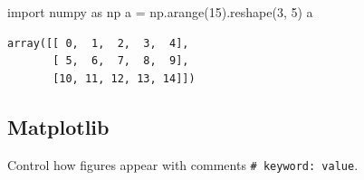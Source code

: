 \documentclass[
  letterpaper,
  DIV=11,
  numbers=noendperiod,
  oneside]{scrartcl}
\newenvironment{Shaded}{\begin{snugshade}}{\end{snugshade}}
\newcommand{\DecValTok}[1]{\textcolor[rgb]{0.68,0.00,0.00}{#1}}
\newcommand{\ImportTok}[1]{\textcolor[rgb]{0.00,0.46,0.62}{#1}}
\newcommand{\NormalTok}[1]{\textcolor[rgb]{0.00,0.23,0.31}{#1}}
\newcommand{\OperatorTok}[1]{\textcolor[rgb]{0.37,0.37,0.37}{#1}}
\begin{document}
\begin{Shaded}
\begin{Highlighting}[]
\ImportTok{import}\NormalTok{ numpy }\ImportTok{as}\NormalTok{ np}
\NormalTok{a }\OperatorTok{=}\NormalTok{ np.arange(}\DecValTok{15}\NormalTok{).reshape(}\DecValTok{3}\NormalTok{, }\DecValTok{5}\NormalTok{)}
\NormalTok{a}
\end{Highlighting}
\end{Shaded}

\begin{verbatim}
array([[ 0,  1,  2,  3,  4],
       [ 5,  6,  7,  8,  9],
       [10, 11, 12, 13, 14]])
\end{verbatim}

\hypertarget{matplotlib}{%
\subsection{Matplotlib}\label{matplotlib}}

Control how figures appear with comments
\texttt{\#\textbar{}\ keyword:\ value}. 
\end{document}
